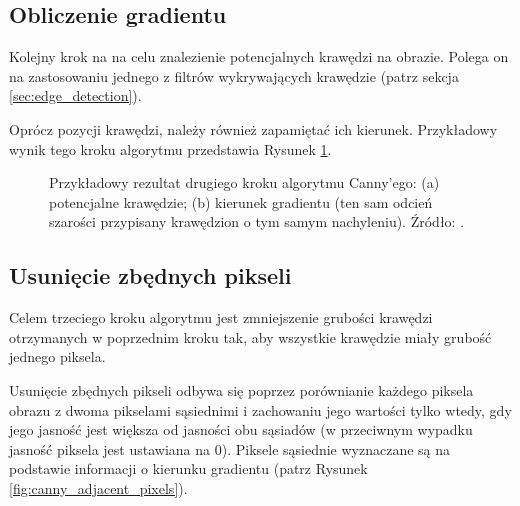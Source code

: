 \documentclass[a4paper,twocolumn,12pt]{article}
\begin{document}
\subsection{Obliczenie gradientu}

Kolejny krok na na celu znalezienie potencjalnych krawędzi na obrazie.
Polega on na zastosowaniu jednego z filtrów wykrywających krawędzie (patrz sekcja \ref{sec:edge_detection}).

Oprócz pozycji krawędzi, należy również zapamiętać ich kierunek.
Przykładowy wynik tego kroku algorytmu przedstawia Rysunek \ref{fig:canny_gradient}.

\begin{figure}[!ht]
 \begin{center}
 \end{center}
 \caption{
  Przykładowy rezultat drugiego kroku algorytmu Canny'ego:
  (a) potencjalne krawędzie;
  (b) kierunek gradientu (ten sam odcień szarości przypisany krawędzion o tym samym nachyleniu).
  Źródło: \cite{boldak}.
 }
 \label{fig:canny_gradient}
\end{figure}


\subsection{Usunięcie zbędnych pikseli}

Celem trzeciego kroku algorytmu jest zmniejszenie grubości krawędzi otrzymanych w poprzednim kroku tak, aby wszystkie krawędzie miały grubość jednego piksela.

Usunięcie zbędnych pikseli odbywa się poprzez porównianie każdego piksela obrazu z dwoma pikselami sąsiednimi i zachowaniu jego wartości tylko wtedy, gdy jego jasność jest większa od jasności obu sąsiadów (w przeciwnym wypadku jasność piksela jest ustawiana na 0).
Piksele sąsiednie wyznaczane są na podstawie informacji o kierunku gradientu (patrz Rysunek \ref{fig:canny_adjacent_pixels}).
\end{document}
